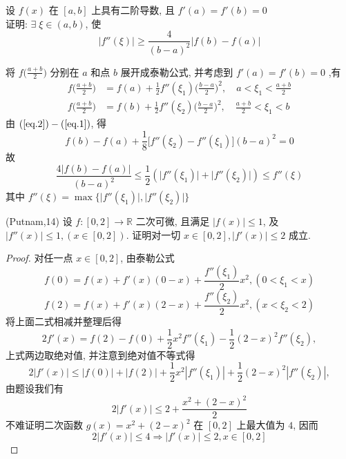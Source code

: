 \documentclass[color=green,titlestyle=hang]{elegantbook}%
\begin{document}
\begin{exercise}设 $f(x)$ 在 $[a,b]$ 上具有二阶导数, 且 $f'(a)=f'(b)=0$ \\
证明:  $\exists\;\xi\in(a,b)$, 使 
\begin{equation*}\big|f''(\xi)\big|\geqslant\frac{4}{(b-a)^2}\big|f(b)-f(a)\big|\end{equation*}	
\end{exercise}\begin{Solution} 将 $\displaystyle f\bigg(\frac{a+b}{2}\bigg)$ 分别在 $a$ 和点 $b$ 展开成泰勒公式, 并考虑到 $f'(a)=f'(b)=0$ ,有
\begin{align}f\bigg(\frac{a+b}{2}\bigg)&=f(a)+\frac{1}{2}f''(\xi_1)\bigg(\frac{b-a}{2}\bigg)^2,\quad a<\xi_1<\frac{a+b}{2}\label{eq.1}\\
f\bigg(\frac{a+b}{2}\bigg)&=f(b)+\frac{1}{2}f''(\xi_2)\bigg(\frac{b-a}{2}\bigg)^2,\quad \frac{a+b}{2}<\xi_1<b\label{eq.2}
\end{align}
由 $(\ref{eq.2})-(\ref{eq.1})$, 得
\begin{equation*}f(b)-f(a)+\frac{1}{8}\big[f''(\xi_2)-f''(\xi_1)\big](b-a)^2=0\end{equation*}
故\begin{equation*}\frac{4\big|f(b)-f(a)\big|}{(b-a)^2}\leqslant\frac{1}{2}\left(\big|f''(\xi_1)\big|+\big|f''(\xi_2)\big|\right)\leqslant f''(\xi)\end{equation*}
其中 $f''(\xi)=\max\Big\{\big|f''(\xi_1)\big|,\big|f''(\xi_2)\big|\Big\}$
\end{Solution}

\begin{example}
(Putnam,14) 设 $f:[0,2]\to\mathbb{R}$ 二次可微, 且满足 $|f(x)|\leqslant1$, 及  $|f''(x)|\leqslant1, (x\in[0,2])$. 证明对一切 $x\in[0,2], |f'(x)|\leqslant2$ 成立.
\end{example}\begin{proof}
对任一点 $x\in[0,2]$, 由泰勒公式
\[f(0)=f(x)+f'(x)(0-x)+\frac{f''(\xi_1)}{2}x^2, (0<\xi_1<x)\]
\[f(2)=f(x)+f'(x)(2-x)+\frac{f''(\xi_2)}{2}x^2, (x<\xi_2<2)\]
将上面二式相减并整理后得
\[2f'(x)=f(2)-f(0)+\frac{1}{2}x^2f''(\xi_1)-\frac{1}{2}(2-x)^2f''(\xi_2),\]
上式两边取绝对值, 并注意到绝对值不等式得
\[2|f'(x)|\leqslant|f(0)|+|f(2)|+\frac{1}{2}x^2|f''(\xi_1)|+\frac{1}{2}(2-x)^2|f''(\xi_2)|,\]
由题设我们有
\[2|f'(x)|\leqslant2+\frac{x^2+(2-x)^2}{2}\]
不难证明二次函数 $g(x)=x^2+(2-x)^2$ 在 $[0,2]$ 上最大值为 $4$, 因而
\[2|f'(x)|\leqslant4\Longrightarrow |f'(x)|\leqslant2,x\in[0,2]\]
\end{proof}
\end{document}
